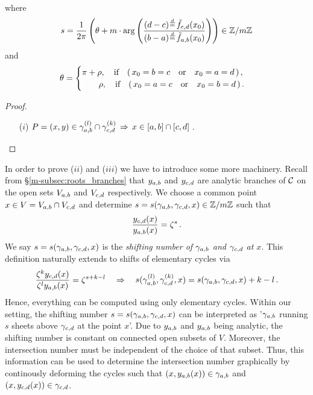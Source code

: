 \documentclass[main.tex]{subfiles}
\begin{document}
\begin{thm}
\begin{itemize}
\begin{align*}
       \end{align*}
       where  
       \begin{align}\label{eq:shift_numb}
       s = \frac{1}{2\pi} \left( \theta +  m \cdot \arg \left( \frac{(d-c)^{\frac{d}{m}} \tilde{f}_{c,d}(x_0)}{(b-a)^{\frac{d}{m}} \tilde{f}_{a,b}(x_0)} \right) \right) \in \mathbb{Z}/m\mathbb{Z}
       \end{align}
       and 
       \begin{align*}
        \theta = \begin{cases}
                              \pi+\rho, \quad \text{if} \quad (\,x_0 = b = c \quad \text{or} \quad x_0 = a = d\,)\,,\\
                              \hspace{0.7cm} \rho, \quad \text{if} \quad (\,x_0 = a = c \quad \text{or} \quad x_0 = b = d\,)\,.
                             \end{cases}
       \end{align*}
      \end{itemize}
 \end{thm}

  \begin{proof}\let\qed\relax
   \begin{itemize}
    \item[($i$)] $P = (x,y) \in \gamma_{a,b}^{(l)} \cap \gamma_{c,d}^{(k)} \,  \Rightarrow \, x \in [a,b] \cap [c,d]$\,.
   \end{itemize}
  \end{proof}
  
  In order to prove ($ii$) and ($iii$) we have to introduce some more machinery. Recall from \S \ref{m-subsec:roots_branches} that $y_{a,b}$ and $y_{c,d}$ are analytic branches of $\mathcal{C}$ on the open sets
  $V_{a,b}$ and $V_{c,d}$ respectively. \abstandl
  We choose a common point $x \in V = V_{a,b} \cap V_{c,d}$ and determine $s  = s(\gamma_{a,b},\gamma_{c,d},x) \in \mathbb{Z}/m\mathbb{Z}$  such that
  \begin{align}
	  \frac{y_{c,d}(x)}{y_{a,b}(x)} = \zeta^s \,.
  \end{align}
  We say $s  = s(\gamma_{a,b},\gamma_{c,d},x)$ is the \emph{shifting number of $\gamma_{a,b}$ and $\gamma_{c,d}$ at $x$}.
  This definition naturally extends to shifts of elementary cycles via
\begin{align}\label{eq:shift_numb_rel}
	 \frac{\zeta^ky_{c,d}(x)}{\zeta^ly_{a,b}(x)} = \zeta^{s+k-l} \quad \Rightarrow \quad s(\gamma_{a,b}^{(l)},\gamma_{c,d}^{(k)},x) = s(\gamma_{a,b},\gamma_{c,d},x) + k - l\,.
\end{align}
	Hence, everything can be computed using only elementary cycles. \abstandl
	Within our setting, the shifting number $s=s(\gamma_{a,b},\gamma_{c,d},x)$  can be interpreted as '$\gamma_{a,b}$ running $s$ sheets above $\gamma_{c,d}$ at the point $x$'. 
	Due to $y_{a,b}$ and $y_{a,b}$ being analytic, the shifting number is constant on connected open subsets of $V$. Moreover, the intersection number must be independent of the choice of that subset. \abstandl
	Thus,
	this information can be used to determine
	the intersection number graphically by continously deforming the cycles such that $(x,y_{a,b}(x)) \in \gamma_{a,b}$ and $(x,y_{c,d}(x)) \in \gamma_{c,d}$.
	
\end{document}
